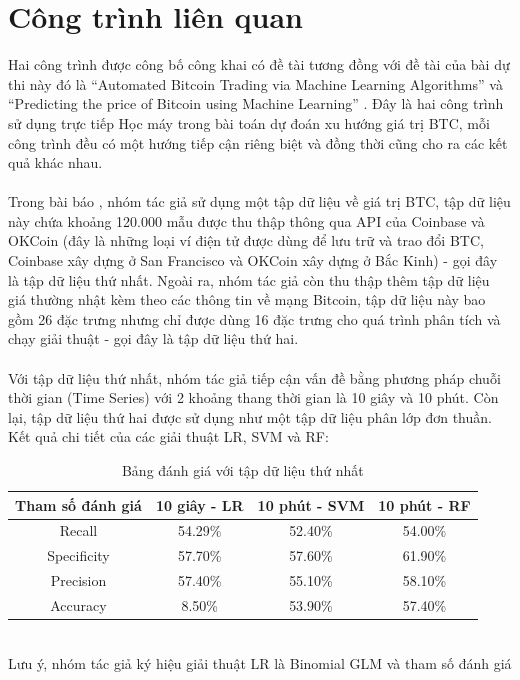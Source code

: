 \section{Công trình liên quan}
Hai công trình được công bố công khai có đề tài tương đồng với đề tài của bài dự thi này đó là 
``Automated Bitcoin Trading via Machine Learning Algorithms'' \cite{AutomatedBitcoinTrading}
và ``Predicting the price of Bitcoin using Machine Learning'' \cite{PredictingThePriceOfBitcoin}.
Đây là hai công trình sử dụng trực tiếp Học máy trong bài toán dự đoán xu hướng 
giá trị BTC, mỗi công trình đều có một hướng tiếp cận riêng biệt và đồng thời 
cũng cho ra các kết quả khác nhau.\\\\
Trong bài báo \cite{AutomatedBitcoinTrading}, nhóm tác giả sử dụng một tập dữ 
liệu về giá trị BTC, tập dữ liệu này chứa khoảng 120.000 mẫu được thu thập thông 
qua API của Coinbase và OKCoin (đây là những loại ví điện tử được dùng để lưu 
trữ và trao đổi BTC, Coinbase xây dựng ở San Francisco và OKCoin xây dựng ở Bắc 
Kinh) - gọi đây là tập dữ liệu thứ nhất. Ngoài ra, nhóm tác giả còn thu thập 
thêm tập dữ liệu giá thường nhật kèm theo các thông tin về mạng Bitcoin, tập dữ 
liệu này bao gồm 26 đặc trưng nhưng chỉ được dùng 16 đặc trưng cho quá trình 
phân tích và chạy giải thuật - gọi đây là tập dữ liệu thứ hai.\\\\
Với tập dữ liệu thứ nhất, nhóm tác giả tiếp cận vấn đề bằng phương pháp chuỗi 
thời gian (Time Series) với 2 khoảng thang thời gian là 10 giây và 10 phút. Còn 
lại, tập dữ liệu thứ hai được sử dụng như một tập dữ liệu phân lớp đơn thuần.
Kết quả chi tiết của các giải thuật LR, SVM và RF:
\begin{table}[h]
\centering
\fontsize{8}{9}\selectfont
\begin{tabular}{ |c|c|c|c| }
\hline
Tham số đánh giá & 10 giây - LR & 10 phút - SVM & 10 phút - RF \\
\hline
Recall & 54.29\% & 52.40\% & 54.00\% \\
\hline
Specificity & 57.70\% & 57.60\% & 61.90\% \\
\hline
Precision & 57.40\% & 55.10\% & 58.10\% \\
\hline
Accuracy & 8.50\% & 53.90\% & 57.40\% \\
\hline
\end{tabular}
\caption{Bảng đánh giá với tập dữ liệu thứ nhất}
\end{table}\\
Lưu ý, nhóm tác giả ký hiệu giải thuật LR là Binomial GLM và tham số đánh giá 

